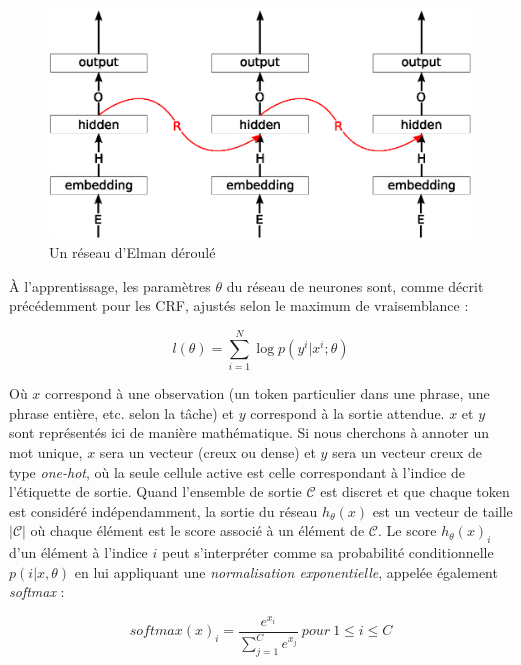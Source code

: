 \documentclass[12pt,a4paper,times,twoside,openright]{report}
\begin{document}
\begin{figure}[ht!]
\centering
\includegraphics[scale=0.75]{images/NN/Elman-unrolled}
\caption{Un réseau d'Elman déroulé}
\label{fig:unrolled-RNN}
\end{figure}

À l'apprentissage, les paramètres $\theta$ du réseau de neurones sont, comme décrit précédemment pour les CRF, ajustés selon le maximum de vraisemblance :

\begin{equation} \label{eq:NN-log-likelihood}
l(\theta) = \sum_{i=1}^{N} \log p(y^{i} | x^{i}; \theta)
\end{equation}

Où $x$ correspond à une observation (un token particulier dans une phrase, une phrase entière, etc. selon la tâche) et $y$ correspond à la sortie attendue. $x$ et $y$ sont représentés ici de manière mathématique. Si nous cherchons à annoter un mot unique, $x$ sera un vecteur (creux ou dense) et $y$ sera un vecteur creux de type \textit{one-hot}, où la seule cellule active est celle correspondant à l'indice de l'étiquette de sortie. Quand l'ensemble de sortie $\mathcal{C}$ est discret et que chaque token est considéré indépendamment, la sortie du réseau $h_{\theta}(x)$ est un vecteur de taille $|\mathcal{C}|$ où chaque élément est le score associé à un élément de $\mathcal{C}$. Le score $h_{\theta}(x)_{i}$ d'un élément à l'indice $i$ peut s'interpréter comme sa probabilité conditionnelle $p(i|x,\theta)$ en lui appliquant une \emph{normalisation exponentielle}, appelée également \emph{softmax} :

\begin{equation} \label{eq:softmax}
softmax(x)_{i} = \frac{e^{x_{i}}}{\sum_{j=1}^{C}e^{x_{j}}}\ pour\ 1 \leq i \leq C
\end{equation}
\end{document}
